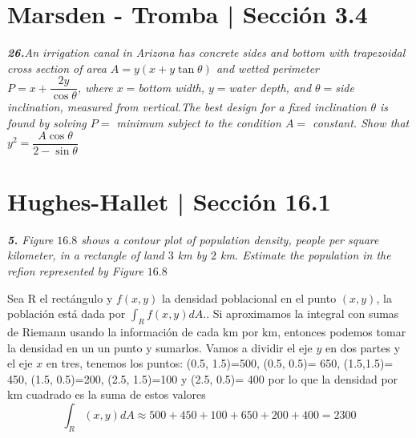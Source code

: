 \documentclass[a4paper,12pt]{article}
\begin{document}
	\section{Marsden - Tromba | Sección 3.4}
	\textit{\textbf{26.}An irrigation canal in Arizona has concrete sides and bottom with trapezoidal cross section of area
 $A = y(x + y \tan \theta)$ and wetted perimeter \\
 $P = x + \dfrac{2y}{\cos \theta}$, where $x = $bottom width, $y = $water depth, and $\theta =$side inclination, measured
 from vertical.The best design for a fixed inclination $\theta$ is found by solving $P =$ minimum subject to the condition
 $A =$ constant. Show that $y^2 =\dfrac{A \cos \theta}{2 - \sin \theta}$
}
	\section{Hughes-Hallet | Sección 16.1}
	\textit{\textbf{5.} Figure $16.8$ shows a contour plot of population density, people per square kilometer, in a rectangle of land $3$ km by $2$ km. Estimate the population in the refion represented by Figure $16.8$}

Sea R el rectángulo y $f(x,y)$ la densidad poblacional en el punto $(x,y)$, la población está dada por $\int_{R}f(x,y)dA$.. Si aproximamos la integral con sumas de Riemann usando la información de cada km por km, entonces podemos tomar la densidad en un un punto y sumarlos.
Vamos a dividir el eje $y$ en dos partes y el eje $x$ en tres, tenemos los puntos:
(0.5, 1.5)=500, (0.5, 0.5)= 650, (1.5,1.5)= 450, (1.5, 0.5)=200, (2.5, 1.5)=100 y (2.5, 0.5)= 400
por lo que la densidad por km cuadrado es la suma de estos valores
\[\int_{R}(x,y)dA\approx 500 + 450 + 100 + 650 + 200 + 400 = 2300\]
\end{document}
